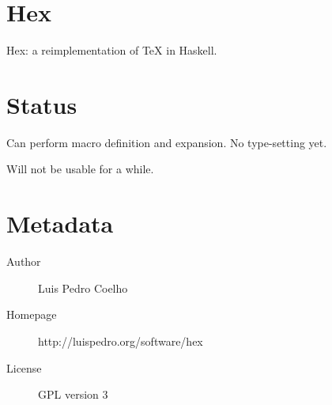 \documentclass{article}
\begin{document}
\section{Hex}

Hex: a reimplementation of \TeX{} in Haskell.

\section{Status}

Can perform macro definition and expansion. No type-setting yet.

Will not be usable for a while.

\section{Metadata}

\begin{description}
\item[Author] Luis Pedro Coelho
\item[Homepage] http://luispedro.org/software/hex
\item[License] GPL version 3
\end{description}
\end{document}
